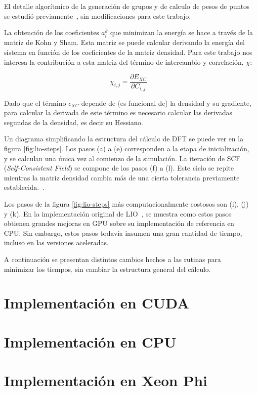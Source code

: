 El detalle algor\'itmico de la generaci\'on de grupos y de calculo de pesos de puntos
se estudi\'o previamente~\cite{Nitsche2014,TesisNitsche}, sin modificaciones para este trabajo.

La obtenci\'on de los coeficientes $a^k_i$ que minimizan la energ\'ia se hace a trav\'es de la
matriz de Kohn y Sham. Esta matriz se puede calcular derivando la energ\'ia del sistema en
funci\'on de los coeficientes de la matriz densidad. Para este trabajo nos interesa la
contribuci\'on a esta matriz del t\'ermino de intercambio y correlaci\'on, $\chi$:

\begin{equation}
  \chi_{i,j} = \frac{\partial E_{XC}}{\partial C_{i,j}}
\end{equation}

Dado que el t\'ermino $\epsilon_{XC}$ depende de (es funcional de) la densidad y su gradiente,
para calcular la derivada de este t\'ermino es necesario calcular las derivadas segundas de la
densidad, es decir su Hessiano.

Un diagrama simplificando la estructura del c\'alculo de DFT se puede ver en la figura \ref{fig:lio-steps}.
Los pasos (a) a (e) corresponden a la etapa de inicializaci\'on, y se calculan una \'unica vez
al comienzo de la simulaci\'on. La iteraci\'on de SCF (\textit{Self-Consistent Field}) se
compone de los pasos (f) a (l). Este ciclo se repite mientras la matriz densidad cambia
m\'as de una cierta tolerancia previamente establecida.~\cite{Nitsche2014}.

Los pasos de la figura \ref{fig:lio-steps} m\'as computacionalmente costosos son (i), (j) y (k).
En la implementaci\'on original de LIO~\cite{TesisNitsche}, se muestra como estos pasos
obtienen grandes mejoras en GPU sobre su implementaci\'on de referencia en CPU. Sin embargo,
estos pasos todav\'ia insumen una gran cantidad de tiempo, incluso en las versiones aceleradas.

A continuaci\'on se presentan distintos cambios hechos a las rutinas para minimizar los tiempos,
sin cambiar la estructura general del c\'alculo.

\section{Implementaci\'on en CUDA}



\section{Implementaci\'on en CPU}



\section{Implementaci\'on en Xeon Phi}


